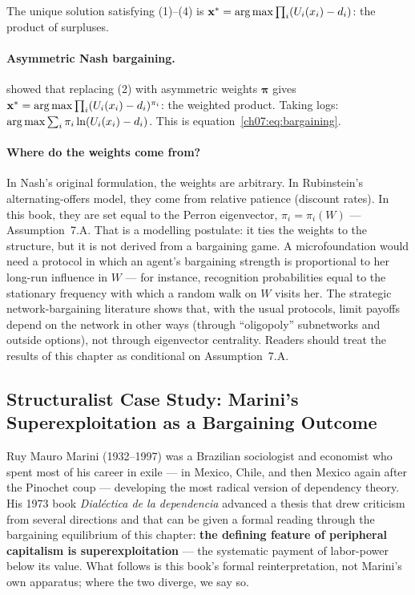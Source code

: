 \documentclass[../structural_economics_book.tex]{subfiles}
\begin{document}
The unique solution satisfying (1)--(4) is $\mathbf{x}^* = \operatorname*{arg\,max} \prod_i (U_i(x_i) - d_i)$: the product of surpluses.

\paragraph{Asymmetric Nash bargaining.} \citet{kalai1977nonsymmetric} showed that replacing (2) with asymmetric weights $\boldsymbol{\pi}$ gives $\mathbf{x}^* = \operatorname*{arg\,max} \prod_i (U_i(x_i) - d_i)^{\pi_i}$: the weighted product. Taking logs: $\operatorname*{arg\,max} \sum_i \pi_i \ln(U_i(x_i) - d_i)$. This is equation~\eqref{ch07:eq:bargaining}.

\paragraph{Where do the weights come from?} In Nash's original formulation, the weights are arbitrary. In Rubinstein's \citeyearpar{rubinstein1982perfect} alternating-offers model, they come from relative patience (discount rates). In this book, they are set equal to the Perron eigenvector, $\pi_i = \pi_i(W)$ --- Assumption~7.A. That is a modelling postulate: it ties the weights to the structure, but it is not derived from a bargaining game. A microfoundation would need a protocol in which an agent's bargaining strength is proportional to her long-run influence in $W$ --- for instance, recognition probabilities equal to the stationary frequency with which a random walk on $W$ visits her. The strategic network-bargaining literature \citep{manea2011bargaining,abreu2012bargaining,abreu2012markov} shows that, with the usual protocols, limit payoffs depend on the network in other ways (through ``oligopoly'' subnetworks and outside options), not through eigenvector centrality. Readers should treat the results of this chapter as conditional on Assumption~7.A.


\subsection*{Structuralist Case Study: Marini's Superexploitation as a Bargaining Outcome}

Ruy Mauro Marini (1932--1997) was a Brazilian sociologist and economist who spent most of his career in exile --- in Mexico, Chile, and then Mexico again after the Pinochet coup --- developing the most radical version of dependency theory. His 1973 book \textit{Dial\'{e}ctica de la dependencia} advanced a thesis that drew criticism from several directions and that can be given a formal reading through the bargaining equilibrium of this chapter: \textbf{the defining feature of peripheral capitalism is superexploitation} --- the systematic payment of labor-power below its value. What follows is this book's formal reinterpretation, not Marini's own apparatus; where the two diverge, we say so.
\end{document}
